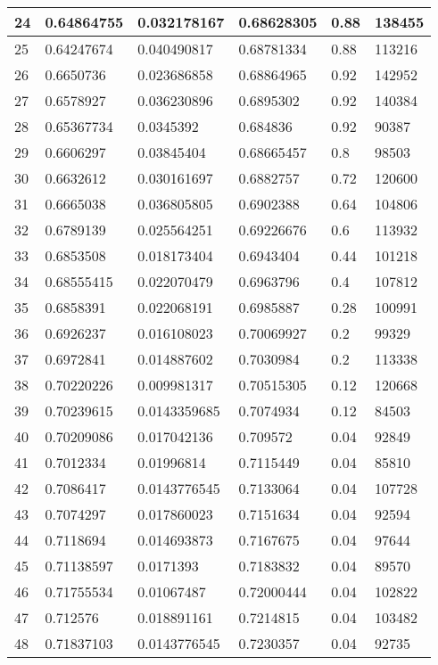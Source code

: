 \begin{longtable}{|l|l|l|l|l|l|}
24 & 0.64864755 & 0.032178167 & 0.68628305 & 0.88 & 138455 \\ \hline 
25 & 0.64247674 & 0.040490817 & 0.68781334 & 0.88 & 113216 \\ \hline 
26 & 0.6650736 & 0.023686858 & 0.68864965 & 0.92 & 142952 \\ \hline 
27 & 0.6578927 & 0.036230896 & 0.6895302 & 0.92 & 140384 \\ \hline 
28 & 0.65367734 & 0.0345392 & 0.684836 & 0.92 & 90387 \\ \hline 
29 & 0.6606297 & 0.03845404 & 0.68665457 & 0.8 & 98503 \\ \hline 
30 & 0.6632612 & 0.030161697 & 0.6882757 & 0.72 & 120600 \\ \hline 
31 & 0.6665038 & 0.036805805 & 0.6902388 & 0.64 & 104806 \\ \hline 
32 & 0.6789139 & 0.025564251 & 0.69226676 & 0.6 & 113932 \\ \hline 
33 & 0.6853508 & 0.018173404 & 0.6943404 & 0.44 & 101218 \\ \hline 
34 & 0.68555415 & 0.022070479 & 0.6963796 & 0.4 & 107812 \\ \hline 
35 & 0.6858391 & 0.022068191 & 0.6985887 & 0.28 & 100991 \\ \hline 
36 & 0.6926237 & 0.016108023 & 0.70069927 & 0.2 & 99329 \\ \hline 
37 & 0.6972841 & 0.014887602 & 0.7030984 & 0.2 & 113338 \\ \hline 
38 & 0.70220226 & 0.009981317 & 0.70515305 & 0.12 & 120668 \\ \hline 
39 & 0.70239615 & 0.0143359685 & 0.7074934 & 0.12 & 84503 \\ \hline 
40 & 0.70209086 & 0.017042136 & 0.709572 & 0.04 & 92849 \\ \hline 
41 & 0.7012334 & 0.01996814 & 0.7115449 & 0.04 & 85810 \\ \hline 
42 & 0.7086417 & 0.0143776545 & 0.7133064 & 0.04 & 107728 \\ \hline 
43 & 0.7074297 & 0.017860023 & 0.7151634 & 0.04 & 92594 \\ \hline 
44 & 0.7118694 & 0.014693873 & 0.7167675 & 0.04 & 97644 \\ \hline 
45 & 0.71138597 & 0.0171393 & 0.7183832 & 0.04 & 89570 \\ \hline 
46 & 0.71755534 & 0.01067487 & 0.72000444 & 0.04 & 102822 \\ \hline 
47 & 0.712576 & 0.018891161 & 0.7214815 & 0.04 & 103482 \\ \hline 
48 & 0.71837103 & 0.0143776545 & 0.7230357 & 0.04 & 92735 \\ \hline 

\end{longtable}
